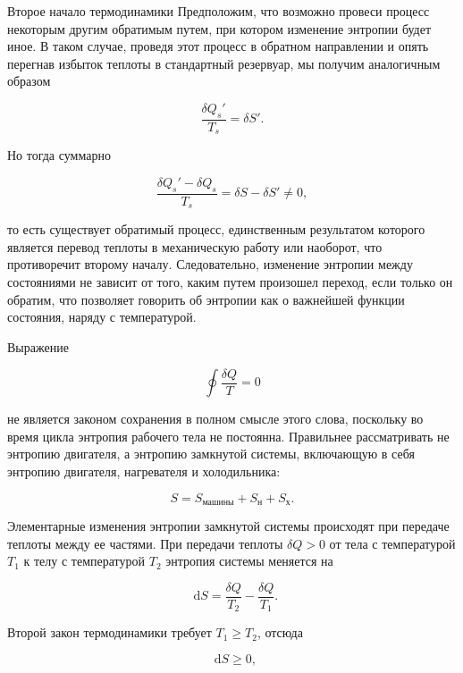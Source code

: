 \documentclass{article}
\renewcommand{\d}{\mathop{}\!\mathrm{d}}
\begin{document}
\begin{section}{Второе начало термодинамики}
		Предположим, что возможно провеси процесс некоторым другим обратимым путем, при котором изменение энтропии будет иное. В таком случае, проведя этот процесс в обратном направлении и опять перегнав избыток теплоты в стандартный резервуар, мы получим аналогичным образом

		\begin{equation*}
			\frac{\delta Q_s'}{T_s} = \delta S'.
		\end{equation*}

		Но тогда суммарно

		\begin{equation*}
			\frac{\delta Q_s' - \delta Q_s}{T_s} = \delta S - \delta S' \ne 0,
		\end{equation*}

		то есть существует обратимый процесс, единственным результатом которого является перевод теплоты в механическую работу или наоборот, что противоречит второму началу. Следовательно, изменение энтропии между состояниями не зависит от того, каким путем произошел переход, если только он обратим, что позволяет говорить об энтропии как о важнейшей функции состояния, наряду с температурой.

		Выражение

		\begin{equation*}
			\oint \frac{\delta Q}{T} = 0
		\end{equation*}

		не является законом сохранения в полном смысле этого слова, поскольку во время цикла энтропия рабочего тела не постоянна. Правильнее рассматривать не энтропию двигателя, а энтропию замкнутой системы, включающую в себя энтропию двигателя, нагревателя и холодильника:

		\begin{equation*}
			S = S_{\text{машины}} + S_{\text{н}} + S_{\text{х}}.
		\end{equation*}

		Элементарные изменения энтропии замкнутой системы происходят при передаче теплоты между ее частями. При передачи теплоты $\delta Q > 0$ от тела с температурой $T_1$ к телу с температурой $T_2$ энтропия системы меняется на

		\begin{equation*}
			\d S = \frac{\delta Q}{T_2} - \frac{\delta Q}{T_1}.
		\end{equation*}

		Второй закон термодинамики требует $T_1 \ge T_2$, отсюда

		\begin{equation*}
			\d S \ge 0,
		\end{equation*}


\end{section}
\end{document}
